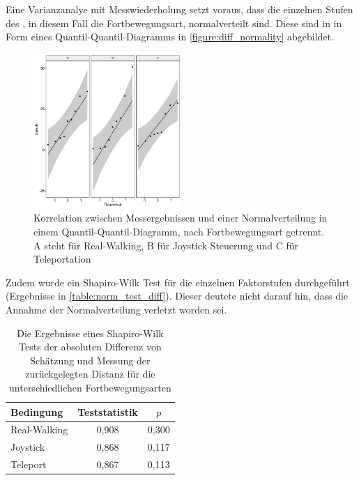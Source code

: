                     Eine Varianzanalye mit Messwiederholung setzt voraus, dass die einzelnen Stufen des , in diesem Fall die Fortbewegungsart, normalverteilt sind. Diese sind in in Form eines Quantil-Quantil-Diagramms in \autoref{figure:diff_normality} abgebildet.

                    \begin{figure}[!h]
                        \centering
                        \includegraphics[width=0.5\textwidth]{plots/diff_normality.png}
                        \caption{Korrelation zwischen Messergebnissen und einer Normalverteilung in einem Quantil-Quantil-Diagramm, nach Fortbewegungsart getrennt. A steht für Real-Walking, B für Joystick Steuerung und C für Teleportation}\label{figure:diff_normality}
                    \end{figure}

                    Zudem wurde ein Shapiro-Wilk Test für die einzelnen Faktorstufen durchgeführt (Ergebnisse in \autoref{table:norm_test_diff}). Dieser deutete nicht darauf hin, dass die Annahme der Normalverteilung verletzt worden sei.

                    \begin{table}[!h]
                        \renewcommand\arraystretch{1.2}
                        \centering
                        \begin{tabular}{lcc} \toprule
                            Bedingung    & Teststatistik    & $p$   \\ \midrule
                            Real-Walking & 0,908            & 0,300 \\
                            Joystick     & 0,868            & 0,117 \\
                            Teleport     & 0,867            & 0,113 \\ \bottomrule
                        \end{tabular}
                        \caption{Die Ergebnisse eines Shapiro-Wilk Tests der absoluten Differenz von Schätzung und Messung der zurückgelegten Distanz für die unterschiedlichen Fortbewegungsarten}\label{table:norm_test_diff}
                    \end{table}

